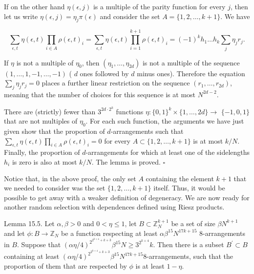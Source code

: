 \documentclass[10pt]{article}
\begin{document}
If on the other hand $\eta(\epsilon, j)$ is a multiple of the parity function for every $j$, then let us write $\eta(\epsilon, j)=\eta_{j} \pi(\epsilon)$ and consider the set $A=\{1,2, \ldots, k+1\}$. We have

$$
\sum_{\epsilon, t} \eta(\epsilon, t) \prod_{i \in A} \rho(\epsilon, t)_{i}=\sum_{\epsilon, t} \eta(\epsilon, t) \prod_{i=1}^{k+1} \rho(\epsilon, t)_{i}=(-1)^{k} h_{1} \ldots h_{k} \sum_{j} \eta_{j} r_{j} .
$$

If $\eta$ is not a multiple of $\eta_{0}$, then $\left(\eta_{1}, \ldots, \eta_{2 d}\right)$ is not a multiple of the sequence $(1, \ldots, 1,-1, \ldots,-1)$ ( $d$ ones followed by $d$ minus ones). Therefore the equation $\sum_{j} \eta_{j} r_{j}=0$ places a further linear restriction on the sequence $\left(r_{1}, \ldots, r_{2 d}\right)$, meaning that the number of choices for this sequence is at most $N^{2 d-2}$.

There are (strictly) fewer than $3^{2 d \cdot 2^{k}}$ functions $\eta:\{0,1\}^{k} \times\{1, \ldots, 2 d\} \rightarrow$ $\{-1,0,1\}$ that are not multiples of $\eta_{0}$. For each such function, the arguments we have just given show that the proportion of $d$-arrangements such that $\sum_{\epsilon, t} \eta(\epsilon, t) \prod_{i \in A} \rho(\epsilon, t)_{i}=0$ for every $A \subset\{1,2, \ldots, k+1\}$ is at most $k / N$. Finally, the proportion of $d$-arrangements for which at least one of the sidelengths $h_{i}$ is zero is also at most $k / N$. The lemma is proved. \(\square\)

Notice that, in the above proof, the only set $A$ containing the element $k+1$ that we needed to consider was the set $\{1,2, \ldots, k+1\}$ itself. Thus, it would be possible to get away with a weaker definition of degeneracy. We are now ready for another random selection with dependences defined using Riesz products.

Lemma 15.5. Let $\alpha, \beta>0$ and $0<\eta\leqslant 1$, let $B \subset \mathbb{Z}_{N}^{k+1}$ be a set of size $\beta N^{k+1}$ and let $\phi: B \rightarrow \mathbb{Z}_{N}$ be a function respecting at least $\alpha \beta^{15} N^{17 k+15}$ 8-arrangements in $B$. Suppose that $(\alpha \eta / 4)^{2^{2^{k+4}+k+3}} \beta^{15} N \geqslant 3^{2^{k+4}} k$. Then there is a subset $B^{\prime} \subset B$ containing at least $(\alpha \eta / 4)^{2^{2^{k+4}+k+3}} \beta^{15} N^{17 k+15} 8$-arrangements, such that the proportion of them that are respected by $\phi$ is at least $1-\eta$.
\end{document}
